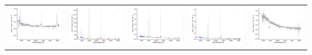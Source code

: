 \begin{center}
\begin{longtable}{l l l l l }
    \includegraphics[width=0.2\linewidth, clip]{Figs/Figs-sdss/spec-9409-58051-0529-STRIPE82-0014-019228.pdf} & \includegraphics[width=0.2\linewidth, clip]{Figs/Figs-sdss/spec-0330-52370-0471-SPLUS-n03s21-043085.pdf} & \includegraphics[width=0.2\linewidth, clip]{Figs/Figs-sdss/spec-0331-52368-0215-SPLUS-n03s23-001039.pdf} & \includegraphics[width=0.2\linewidth, clip]{Figs/Figs-sdss/spec-0331-52368-0449-SPLUS-n02s23-034336.pdf} & \includegraphics[width=0.2\linewidth, clip]{Figs/Figs-sdss/spec-0332-52367-0306-SPLUS-n03s23-034002.pdf} \\

\end{longtable}
\end{center}
